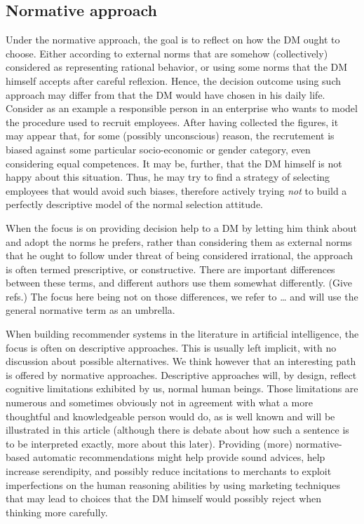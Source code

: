\documentclass[french, english]{llncs}
\begin{document}
	\subsection{Normative approach}
	Under the normative approach, the goal is to reflect on how the \ac{DM} ought to choose. Either according to external norms that are somehow (collectively) considered as representing rational behavior, or using some norms that the \ac{DM} himself accepts after careful reflexion. Hence, the decision outcome using such approach may differ from that the \ac{DM} would have chosen in his daily life. Consider as an example a responsible person in an enterprise who wants to model the procedure used to recruit employees. After having collected the figures, it may appear that, for some (possibly unconscious) reason, the recrutement is biased against some particular socio-economic or gender category, even considering equal competences. It may be, further, that the \ac{DM} himself is not happy about this situation. Thus, he may try to find a strategy of selecting employees that would avoid such biases, therefore actively trying \emph{not} to build a perfectly descriptive model of the normal selection attitude.
	
	When the focus is on providing decision help to a \ac{DM} by letting him think about and adopt the norms he prefers, rather than considering them as external norms that he ought to follow under threat of being considered irrational, the approach is often termed prescriptive, or constructive. There are important differences between these terms, and different authors use them somewhat differently. (Give refs.) The focus here being not on those differences, we refer to … and will use the general normative term as an umbrella.
	
	When building recommender systems in the literature in artificial intelligence, the focus is often on descriptive approaches. This is usually left implicit, with no discussion about possible alternatives. We think however that an interesting path is offered by normative approaches. Descriptive approaches will, by design, reflect cognitive limitations exhibited by us, normal human beings. Those limitations are numerous and sometimes obviously not in agreement with what a more thoughtful and knowledgeable person would do, as is well known and will be illustrated in this article (although there is debate about how such a sentence is to be interpreted exactly, more about this later). Providing (more) normative-based automatic recommendations might help provide sound advices, help increase serendipity, and possibly reduce incitations to merchants to exploit imperfections on the human reasoning abilities by using marketing techniques that may lead to choices that the \ac{DM} himself would possibly reject when thinking more carefully.
	
\end{document}
